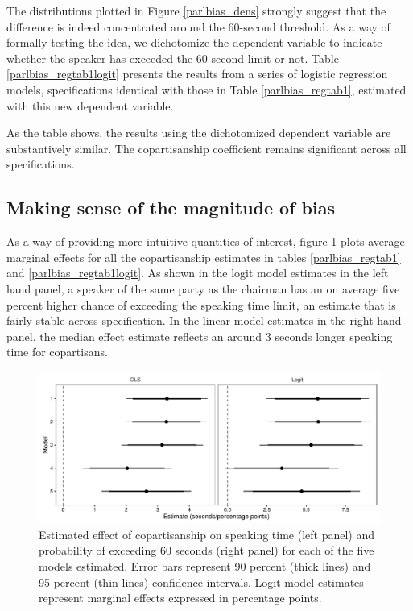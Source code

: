 \documentclass[12pt,a4paper]{article}
\begin{document}
The distributions plotted in Figure \ref{parlbias_dens} strongly suggest that the difference is indeed concentrated around the 60-second threshold. As a way of formally testing the idea, we dichotomize the dependent variable to indicate whether the speaker has exceeded the 60-second limit or not. Table \ref{parlbias_regtab1logit} presents the results from a series of logistic regression models, specifications identical with those in Table \ref{parlbias_regtab1}, estimated with this new dependent variable.



As the table shows, the results using the dichotomized dependent variable are substantively similar. The copartisanship coefficient remains significant across all specifications. 

\subsection{Making sense of the magnitude of bias}
As a way of providing more intuitive quantities of interest, figure \ref{parlbias_effectplot} plots average marginal effects for all the copartisanship estimates in tables \ref{parlbias_regtab1} and \ref{parlbias_regtab1logit}. As shown in the logit model estimates in the left hand panel, a speaker of the same party as the chairman has an on average five percent higher chance of exceeding the speaking time limit, an estimate that is fairly stable across specification. In the linear model estimates in the right hand panel, the median effect estimate reflects an around 3 seconds longer speaking time for copartisans.

\begin{figure}[!htbp]
\centering
\includegraphics[scale=.65]{../figures/parlbias_effectplot}
  \caption{Estimated effect of copartisanship on speaking time (left panel) and probability of exceeding 60 seconds (right panel) for each of the five models estimated. Error bars represent 90 percent (thick lines) and 95 percent (thin lines) confidence intervals. Logit model estimates represent marginal effects expressed in percentage points.}\label{parlbias_effectplot}
\end{figure}
\end{document}
